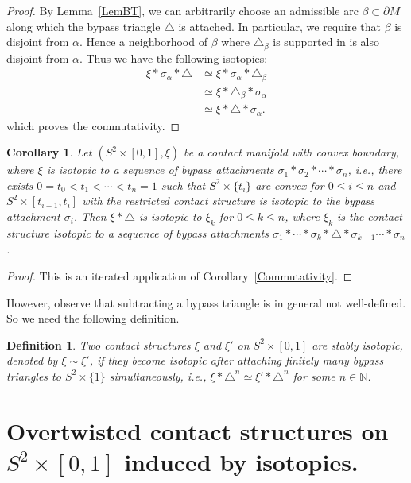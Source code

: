 \documentclass[12pt]{amsart}
\newtheorem{defn}[thm]{Definition}
\newtheorem{cor}[thm]{Corollary}
\theoremstyle{remark}
\newcommand{\bdry}{\partial}
\begin{document}
\begin{proof}
By Lemma~\ref{LemBT}, we can arbitrarily choose an admissible arc $\beta\subset\bdry M$ along which the bypass triangle $\triangle$ is attached. In particular, we require that $\beta$ is disjoint from $\alpha$. Hence a neighborhood of $\beta$ where $\triangle_\beta$ is supported in is also disjoint from $\alpha$. Thus we have the following isotopies:
\begin{align*}
\xi\ast\sigma_\alpha\ast\triangle &\simeq \xi\ast\sigma_\alpha\ast\triangle_\beta \\
                                      &\simeq\xi\ast \triangle_\beta\ast\sigma_\alpha \\
                                      &\simeq\xi\ast \triangle\ast\sigma_\alpha.
\end{align*}
which proves the commutativity.
\end{proof}

\begin{cor}
Let $(S^2\times[0,1],\xi)$ be a contact manifold with convex boundary, where $\xi$ is isotopic to a sequence of bypass attachments $\sigma_1\ast\sigma_2\ast\cdots\ast\sigma_n$, i.e., there exists $0=t_0<t_1<\cdots<t_n=1$ such that $S^2\times\{t_i\}$ are convex for $0\leq i\leq n$ and $S^2\times[t_{i-1},t_i]$ with the restricted contact structure is isotopic to the bypass attachment $\sigma_i$. Then $\xi\ast\triangle$ is isotopic to $\xi_k$ for $0\leq k\leq n$, where $\xi_k$ is the contact structure isotopic to a sequence of bypass attachments $\sigma_1\ast\cdots\ast\sigma_k\ast\triangle\ast\sigma_{k+1}\cdots\ast\sigma_n$.
\end{cor}

\begin{proof}
This is an iterated application of Corollary~\ref{Commutativity}.
\end{proof}

However, observe that subtracting a bypass triangle is in general not well-defined. So we need the following definition.

\begin{defn} \label{WeakIso}
Two contact structures $\xi$ and $\xi'$ on $S^2\times[0,1]$ are {\em stably isotopic}, denoted by $\xi\sim\xi'$, if they become isotopic after attaching finitely many bypass triangles to $S^2\times\{1\}$ simultaneously, i.e., $\xi \ast \triangle^n \simeq \xi' \ast \triangle^n$ for some $n\in\mathbb{N}$.
\end{defn}

\section{Overtwisted contact structures on $S^2\times[0,1]$ induced by isotopies.}
\end{document}
